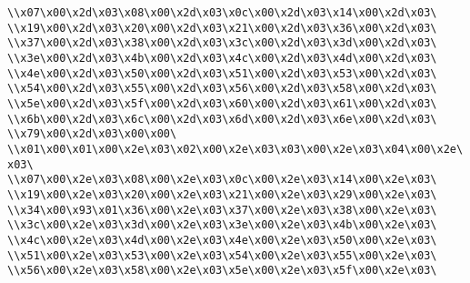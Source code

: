 \verb|\\x07\x00\x2d\x03\x08\x00\x2d\x03\x0c\x00\x2d\x03\x14\x00\x2d\x03\|\newline
\verb|\\x19\x00\x2d\x03\x20\x00\x2d\x03\x21\x00\x2d\x03\x36\x00\x2d\x03\|\newline
\verb|\\x37\x00\x2d\x03\x38\x00\x2d\x03\x3c\x00\x2d\x03\x3d\x00\x2d\x03\|\newline
\verb|\\x3e\x00\x2d\x03\x4b\x00\x2d\x03\x4c\x00\x2d\x03\x4d\x00\x2d\x03\|\newline
\verb|\\x4e\x00\x2d\x03\x50\x00\x2d\x03\x51\x00\x2d\x03\x53\x00\x2d\x03\|\newline
\verb|\\x54\x00\x2d\x03\x55\x00\x2d\x03\x56\x00\x2d\x03\x58\x00\x2d\x03\|\newline
\verb|\\x5e\x00\x2d\x03\x5f\x00\x2d\x03\x60\x00\x2d\x03\x61\x00\x2d\x03\|\newline
\verb|\\x6b\x00\x2d\x03\x6c\x00\x2d\x03\x6d\x00\x2d\x03\x6e\x00\x2d\x03\|\newline
\verb|\\x79\x00\x2d\x03\x00\x00\|\newline
\verb|\\x01\x00\x01\x00\x2e\x03\x02\x00\x2e\x03\x03\x00\x2e\x03\x04\x00\x2e\x03\|\newline
\verb|\\x07\x00\x2e\x03\x08\x00\x2e\x03\x0c\x00\x2e\x03\x14\x00\x2e\x03\|\newline
\verb|\\x19\x00\x2e\x03\x20\x00\x2e\x03\x21\x00\x2e\x03\x29\x00\x2e\x03\|\newline
\verb|\\x34\x00\x93\x01\x36\x00\x2e\x03\x37\x00\x2e\x03\x38\x00\x2e\x03\|\newline
\verb|\\x3c\x00\x2e\x03\x3d\x00\x2e\x03\x3e\x00\x2e\x03\x4b\x00\x2e\x03\|\newline
\verb|\\x4c\x00\x2e\x03\x4d\x00\x2e\x03\x4e\x00\x2e\x03\x50\x00\x2e\x03\|\newline
\verb|\\x51\x00\x2e\x03\x53\x00\x2e\x03\x54\x00\x2e\x03\x55\x00\x2e\x03\|\newline
\verb|\\x56\x00\x2e\x03\x58\x00\x2e\x03\x5e\x00\x2e\x03\x5f\x00\x2e\x03\|\newline
